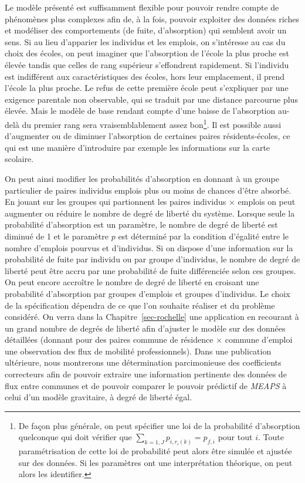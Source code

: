 \documentclass[
  10pt,
  a4paper,
  numbers=noendperiod,
  DIV=9]{scrartcl}
\begin{document}
Le modèle présenté est suffisamment flexible pour pouvoir rendre compte
de phénomènes plus complexes afin de, à la fois, pouvoir exploiter des
données riches et modéliser des comportements (de fuite, d'absorption)
qui semblent avoir un sens. Si au lieu d'apparier les individus et les
emplois, on s'intéresse au cas du choix des écoles, on peut imaginer que
l'absorption de l'école la plus proche est élevée tandis que celles de
rang supérieur s'effondrent rapidement. Si l'individu est indifférent
aux caractéristiques des écoles, hors leur emplacement, il prend l'école
la plus proche. Le refus de cette première école peut s'expliquer par
une exigence parentale non observable, qui se traduit par une distance
parcourue plus élevée. Mais le modèle de base rendant compte d'une
baisse de l'absorption au-delà du premier rang sera vraisemblablement
assez bon\footnote{De façon plus générale, on peut spécifier une loi de
  la probabilité d'absorption quelconque qui doit vérifier que
  \(\sum_{k=1,J} p_{i,r_i(k)} = p_{f,i}\) pour tout \(i\). Toute
  paramétrisation de cette loi de probabilité peut alors être simulée et
  ajustée sur des données. Si les paramètres ont une interprétation
  théorique, on peut alors les identifier.}. Il est possible aussi
d'augmenter ou de diminuer l'absorption de certaines paires
résidents-écoles, ce qui est une manière d'introduire par exemple les
informations sur la carte scolaire.

On peut ainsi modifier les probabilités d'absorption en donnant à un
groupe particulier de paires individus emplois plus ou moins de chances
d'être absorbé. En jouant sur les groupes qui partionnent les paires
individus \(\times\) emplois on peut augmenter ou réduire le nombre de
degré de liberté du système. Lorsque seule la probabilité d'absorption
est un paramètre, le nombre de degré de liberté est diminué de 1 et le
paramètre \(p\) est déterminé par la condition d'égalité entre le nombre
d'emplois pourvus et d'individus. Si on dispose d'une information sur la
probabilité de fuite par individu ou par groupe d'individus, le nombre
de degré de liberté peut être accru par une probabilité de fuite
différenciée selon ces groupes. On peut encore accroître le nombre de
degré de liberté en croisant une probabilité d'absorption par groupes
d'emplois et groupes d'individus. Le choix de la spécification dépendra
de ce que l'on souhaite réaliser et du problème considéré. On verra dans
la Chapitre~\ref{sec-rochelle} une application en recourant à un grand
nombre de degrés de liberté afin d'ajuster le modèle sur des données
détaillées (donnant pour des paires commune de résidence \(\times\)
commune d'emploi une observation des flux de mobilité professionnels).
Dans une publication ultérieure, nous montrerons une détermination
parcimonieuse des coefficients correcteurs afin de pouvoir extraire une
information pertinente des données de flux entre communes et de pouvoir
comparer le pouvoir prédictif de \emph{MEAPS} à celui d'un modèle
gravitaire, à degré de liberté égal.
\end{document}
